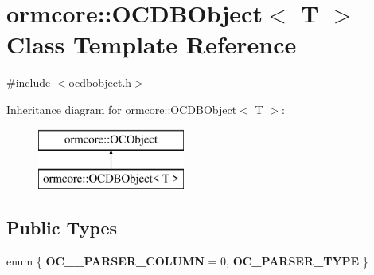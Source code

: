 \hypertarget{classormcore_1_1_o_c_d_b_object}{
\section{ormcore\-:\-:\-O\-C\-D\-B\-Object$<$ \-T $>$ \-Class \-Template \-Reference}
\label{classormcore_1_1_o_c_d_b_object}
}


{\ttfamily \#include $<$ocdbobject.\-h$>$}

\-Inheritance diagram for ormcore\-:\-:\-O\-C\-D\-B\-Object$<$ \-T $>$\-:\begin{figure}[H]
\begin{center}
\leavevmode
\includegraphics[height=2.000000cm]{classormcore_1_1_o_c_d_b_object}
\end{center}
\end{figure}
\subsection*{\-Public \-Types}
\begin{DoxyCompactItemize}
\item 
enum \{ {\bfseries \-O\-C\-\_\-\-\_\-\-P\-A\-R\-S\-E\-R\-\_\-\-C\-O\-L\-U\-M\-N} =  0, 
{\bfseries \-O\-C\-\_\-\-P\-A\-R\-S\-E\-R\-\_\-\-T\-Y\-P\-E}
 \}
\end{DoxyCompactItemize}
